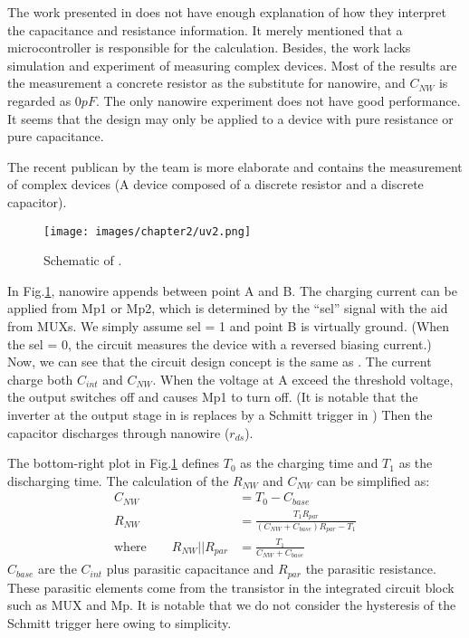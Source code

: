 The work presented in \cite{Juv1} does not have enough explanation of how they interpret the capacitance and resistance information.
It merely mentioned that a microcontroller is responsible for the calculation.
Besides, the work lacks simulation and experiment of measuring complex devices.
Most of the results are the measurement a concrete resistor as the substitute for nanowire, and $C_{NW}$ is regarded as $0pF$.
The only nanowire experiment does not have good performance.
It seems that the design may only be applied to a device with pure resistance or pure capacitance.


The recent publican \cite{Juv2} by the team is more elaborate and contains the measurement of complex devices (A device composed of a discrete resistor and a discrete capacitor).
\begin{figure}[!htbp]
    \centering
    \texttt{[image: images/chapter2/uv2.png]}
    \caption{Schematic of \cite{Juv2}.}
    \label{fig:tot2}
\end{figure}

In Fig.\ref{fig:tot2}, nanowire appends between point A and B.
The charging current can be applied from Mp1 or Mp2, which is determined by the ``sel'' signal with the aid from MUXs.
We simply assume sel = 1 and point B is virtually ground.
(When the sel = 0, the circuit measures the device with a reversed biasing current.)
Now, we can see that the circuit design concept is the same as \cite{Juv1}.
The current charge both $C_{int}$ and $C_{NW}$.
When the voltage at A exceed the threshold voltage, the output switches off and causes Mp1 to turn off.
(It is notable that the inverter at the output stage in \cite{Juv1} is replaces by a Schmitt trigger in \cite{Juv2})
Then the capacitor discharges through nanowire ($r_{ds}$).

The bottom-right plot in Fig.\ref{fig:tot2} defines $T_0$ as the charging time and $T_1$ as the discharging time.
The calculation of the $R_{NW}$ and $C_{NW}$  can be simplified as:
\setlength{\mathindent}{2cm}
\begin{align}
                         C_{NW}            & = T_0 - C_{base}\\
                         R_{NW}            & = \frac{T_1R_{par}}{(C_{NW} + C_{base})R_{par} - T_1}\\
    \text{where} \qquad  R_{NW} || R_{par} & = \frac{T_1}{C_{NW} + C_{base}}
\end{align}
$C_{base}$ are the $C_{int}$ plus parasitic capacitance and $R_{par}$ the parasitic resistance.
These parasitic elements come from the transistor in the integrated circuit block such as MUX and Mp.
It is notable that we do not consider the hysteresis of the Schmitt trigger here owing to simplicity.



